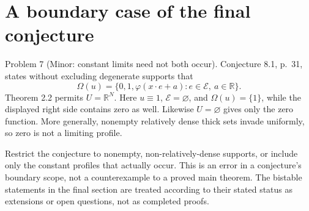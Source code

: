 \documentclass[10pt]{article}
\begin{document}
\section*{A boundary case of the final conjecture}
Problem 7 (Minor: constant limits need not both occur).  Conjecture 8.1, p. 31, states without excluding degenerate supports that \[\Omega(u)=\{0,1,\varphi(x\cdot e+a):
                         e\in\mathcal E,\ a\in\mathbb R\}.\] Theorem 2.2 permits \(U=\mathbb R^N\). Here \(u\equiv1\), \(\mathcal E=\varnothing\), and \(\Omega(u)=\{1\}\), while the displayed right side contains zero as well. Likewise \(U=\varnothing\) gives only the zero function. More generally, nonempty relatively dense thick sets invade uniformly, so zero is not a limiting profile.\par
Restrict the conjecture to nonempty, non-relatively-dense supports, or include only the constant profiles that actually occur. This is an error in a conjecture’s boundary scope, not a counterexample to a proved main theorem. The bistable statements in the final section are treated according to their stated status as extensions or open questions, not as completed proofs.\par
\end{document}
